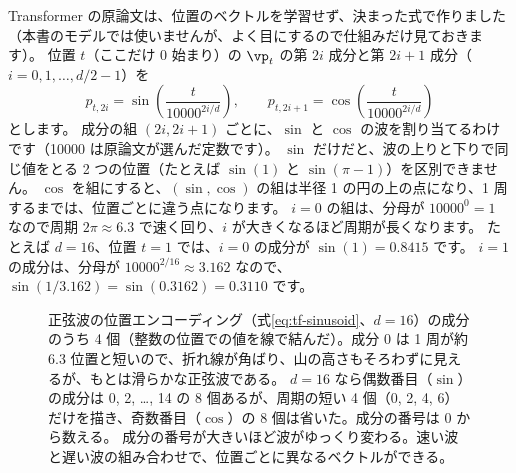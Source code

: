 Transformer の原論文\cite{vaswani2017attention}は、位置のベクトルを学習せず、決まった式で作りました（本書のモデルでは使いませんが、よく目にするので仕組みだけ見ておきます）。
位置 $t$（ここだけ 0 始まり）の $\vp_t$ の第 $2i$ 成分と第 $2i+1$ 成分（$i=0,1,\dots,d/2-1$）を
\begin{equation}
p_{t,2i} = \sin\!\left(\frac{t}{10000^{2i/d}}\right),\qquad
p_{t,2i+1} = \cos\!\left(\frac{t}{10000^{2i/d}}\right)
\label{eq:tf-sinusoid}
\end{equation}
とします。
成分の組 $(2i, 2i+1)$ ごとに、$\sin$ と $\cos$ の波を割り当てるわけです（10000 は原論文が選んだ定数です）。
$\sin$ だけだと、波の上りと下りで同じ値をとる 2 つの位置（たとえば $\sin(1)$ と $\sin(\pi-1)$）を区別できません。
$\cos$ を組にすると、$(\sin,\cos)$ の組は半径 1 の円の上の点になり、1 周するまでは、位置ごとに違う点になります。
$i=0$ の組は、分母が $10000^{0}=1$ なので周期 $2\pi\approx 6.3$ で速く回り、$i$ が大きくなるほど周期が長くなります。
たとえば $d=16$、位置 $t=1$ では、$i=0$ の成分が $\sin(1)=0.8415$ です。
$i=1$ の成分は、分母が $10000^{2/16}\approx3.162$ なので、$\sin(1/3.162)=\sin(0.3162)=0.3110$ です。

\begin{figure}[tbp]
\centering
{}
\caption{正弦波の位置エンコーディング（式\eqref{eq:tf-sinusoid}、$d=16$）の成分のうち 4 個（整数の位置での値を線で結んだ）。成分 0 は 1 周が約 6.3 位置と短いので、折れ線が角ばり、山の高さもそろわずに見えるが、もとは滑らかな正弦波である。
$d=16$ なら偶数番目（$\sin$）の成分は 0, 2, …, 14 の 8 個あるが、周期の短い 4 個（0, 2, 4, 6）だけを描き、奇数番目（$\cos$）の 8 個は省いた。成分の番号は 0 から数える。
成分の番号が大きいほど波がゆっくり変わる。速い波と遅い波の組み合わせで、位置ごとに異なるベクトルができる。}
\label{fig:tf-sinusoid}
\end{figure}


